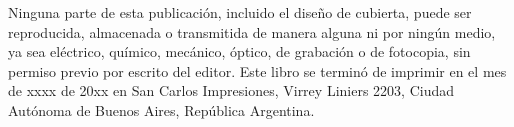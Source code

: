 \vfill

\noindent Ninguna parte de esta publicación, incluido el diseño de cubierta, puede ser reproducida, almacenada o transmitida de manera alguna ni por ningún medio, ya sea eléctrico, químico, mecánico, óptico, de grabación o de fotocopia, sin permiso previo por escrito del editor. Este libro se terminó de imprimir en el mes de xxxx de 20xx en San Carlos Impresiones, Virrey Liniers 2203, Ciudad Autónoma de Buenos Aires, República Argentina.
